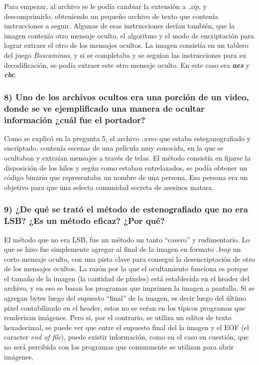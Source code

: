 \documentclass[a4paper,10pt]{article}
\begin{document}
Para empezar, al archivo se le podía cambiar la extensión a \textit{.zip}, y descomprimirlo, obteniendo un pequeño archivo de texto que contenía instrucciones a seguir.
Algunas de esas instrucciones decían también, que la imagen contenía otro mensaje oculto, el algoritmo y el modo de encriptación para lograr extraer el otro de los mensajes ocultos.
La imagen consistía en un tablero del juego \textit{Buscaminas}, y si se completaba y se seguían las instrucciones para su decodificación, se podía extraer este otro mensaje oculto.
En este caso era \textit{\textbf{aes}} y \textit{\textbf{cbc}}.

\subsubsection*{ 8) Uno de los archivos ocultos era una porción de un video, donde se ve ejemplificado una manera
de ocultar información ¿cuál fue el portador?}

Como se explicó en la pregunta 5, el archivo \textit{.wmv} que estaba esteganografiado y encriptado, contenía escenas de una película muy conocida, en la que se 
ocultaban y extraían mensajes a través de telas. El método consistía en fijarse la disposición de los hilos y según como estaban entrelazados, se podía obtener un código 
binario que representaba un nombre de una persona. Esa persona era un objetivo para que una selecta comunidad secreta de asesinos matara.

\subsubsection*{ 9) ¿De qué se trató el método de estenografiado que no era LSB? ¿Es un método eficaz? ¿Por qué?}

El método que no era LSB, fue un método un tanto ``casero'' y rudimentario. Lo que se hizo fue simplemente agregar al final de la imagen en formato \textit{.bmp} un corto mensaje 
oculto, con una pista clave para consegui la desencriptación de otro de los mensajes ocultos. La razón por la que el ocultamiento funciona es porque el tamaño de la imagen (la cantidad
de píxeles) está establecida en el header del archivo, y en eso se basan los programas que imprimen la imagen a pantalla. Si se agregan bytes luego del supuesto ``final'' de la imagen, 
es decir luego del último píxel contabilizado en el header, estos no se veŕan en los típicos programas que renderizan imágenes. Pero si, por el contrario, se utiliza un editor de texto
hexadecimal, se puede ver que entre el supuesto final del la imagen y el EOF (el caracter \textit{end of file}), puede existir información, como en el caso en cuestión, que no será
percibida con los programas que comunmente se utilizan para abrir imágenes.\\
\end{document}
